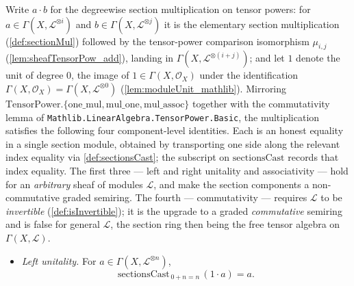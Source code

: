 \begin{lemma}
  \label{lem:sectionMul_coherent}
  Write \(a \cdot b\) for the degreewise section multiplication on tensor powers:
  for \(a \in \Gamma(X, \mathcal{L}^{\otimes i})\) and
  \(b \in \Gamma(X, \mathcal{L}^{\otimes j})\) it is the elementary section
  multiplication (\cref{def:sectionMul}) followed by the tensor-power comparison
  isomorphism \(\mu_{i,j}\) (\cref{lem:sheafTensorPow_add}), landing in
  \(\Gamma(X, \mathcal{L}^{\otimes (i+j)})\); and let \(1\) denote the unit of
  degree \(0\), the image of \(1 \in \Gamma(X,\mathcal{O}_X)\) under the
  identification \(\Gamma(X,\mathcal{O}_X) = \Gamma(X, \mathcal{L}^{\otimes 0})\)
  (\cref{lem:moduleUnit_mathlib}). Mirroring
  \(\mathrm{TensorPower.\{one\_mul, mul\_one, mul\_assoc\}}\) together with the
  commutativity lemma of \texttt{Mathlib.LinearAlgebra.TensorPower.Basic}, the
  multiplication satisfies the following four component-level identities. Each is
  an honest equality in a single section module, obtained by transporting one side
  along the relevant index equality via \cref{def:sectionsCast}; the subscript on
  \(\mathrm{sectionsCast}\) records that index equality. The first three ---
  left and right unitality and associativity --- hold for an \emph{arbitrary}
  sheaf of modules \(\mathcal{L}\), and make the section components a
  non-commutative graded semiring. The fourth --- commutativity --- requires
  \(\mathcal{L}\) to be \emph{invertible} (\cref{def:isInvertible}); it is the
  upgrade to a graded \emph{commutative} semiring and is false for general
  \(\mathcal{L}\), the section ring then being the free tensor algebra on
  \(\Gamma(X,\mathcal{L})\).
  \begin{itemize}
    \item \emph{Left unitality.} For \(a \in \Gamma(X, \mathcal{L}^{\otimes n})\),
      \[
        \mathrm{sectionsCast}_{\,0+n=n}\,(1 \cdot a) = a .
\]
\end{itemize}
\end{lemma}

